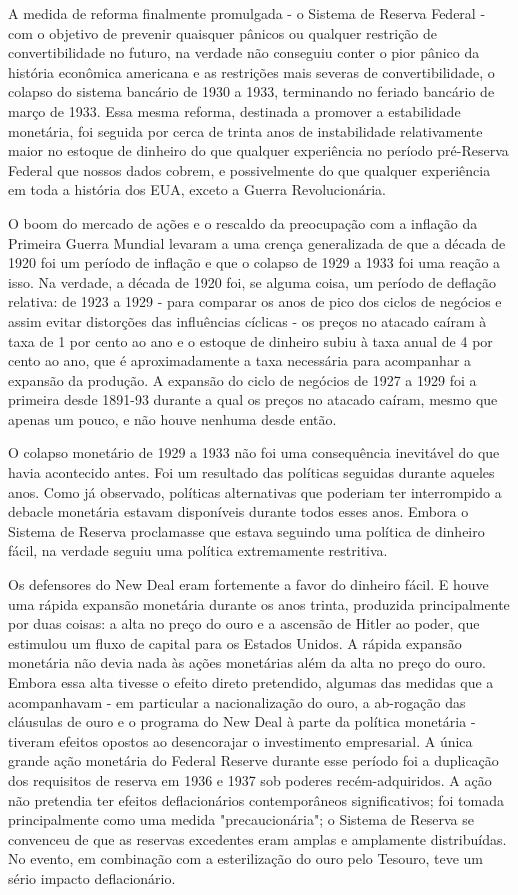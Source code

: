 \documentclass[a4paper,12pt]{article}[abntex2]
\begin{document}
A medida de reforma finalmente promulgada - o Sistema de Reserva Federal - com o objetivo de prevenir quaisquer pânicos ou qualquer restrição de convertibilidade no futuro, na verdade não conseguiu conter o pior pânico da história econômica americana e as restrições mais severas de convertibilidade, o colapso do sistema bancário de 1930 a 1933, terminando no feriado bancário de março de 1933. Essa mesma reforma, destinada a promover a estabilidade monetária, foi seguida por cerca de trinta anos de instabilidade relativamente maior no estoque de dinheiro do que qualquer experiência no período pré-Reserva Federal que nossos dados cobrem, e possivelmente do que qualquer experiência em toda a história dos EUA, exceto a Guerra Revolucionária.

O boom do mercado de ações e o rescaldo da preocupação com a inflação da Primeira Guerra Mundial levaram a uma crença generalizada de que a década de 1920 foi um período de inflação e que o colapso de 1929 a 1933 foi uma reação a isso. Na verdade, a década de 1920 foi, se alguma coisa, um período de deflação relativa: de 1923 a 1929 - para comparar os anos de pico dos ciclos de negócios e assim evitar distorções das influências cíclicas - os preços no atacado caíram à taxa de 1 por cento ao ano e o estoque de dinheiro subiu à taxa anual de 4 por cento ao ano, que é aproximadamente a taxa necessária para acompanhar a expansão da produção. A expansão do ciclo de negócios de 1927 a 1929 foi a primeira desde 1891-93 durante a qual os preços no atacado caíram, mesmo que apenas um pouco, e não houve nenhuma desde então.

O colapso monetário de 1929 a 1933 não foi uma consequência inevitável do que havia acontecido antes. Foi um resultado das políticas seguidas durante aqueles anos. Como já observado, políticas alternativas que poderiam ter interrompido a debacle monetária estavam disponíveis durante todos esses anos. Embora o Sistema de Reserva proclamasse que estava seguindo uma política de dinheiro fácil, na verdade seguiu uma política extremamente restritiva.

Os defensores do New Deal eram fortemente a favor do dinheiro fácil. E houve uma rápida expansão monetária durante os anos trinta, produzida principalmente por duas coisas: a alta no preço do ouro e a ascensão de Hitler ao poder, que estimulou um fluxo de capital para os Estados Unidos. A rápida expansão monetária não devia nada às ações monetárias além da alta no preço do ouro. Embora essa alta tivesse o efeito direto pretendido, algumas das medidas que a acompanhavam - em particular a nacionalização do ouro, a ab-rogação das cláusulas de ouro e o programa do New Deal à parte da política monetária - tiveram efeitos opostos ao desencorajar o investimento empresarial. A única grande ação monetária do Federal Reserve durante esse período foi a duplicação dos requisitos de reserva em 1936 e 1937 sob poderes recém-adquiridos. A ação não pretendia ter efeitos deflacionários contemporâneos significativos; foi tomada principalmente como uma medida "precaucionária"; o Sistema de Reserva se convenceu de que as reservas excedentes eram amplas e amplamente distribuídas. No evento, em combinação com a esterilização do ouro pelo Tesouro, teve um sério impacto deflacionário.
\end{document}
